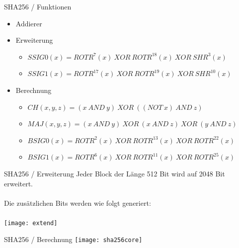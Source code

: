 \documentclass{beamer}
\begin{document}
    \begin{frame}{SHA256 / Funktionen}
      \begin{itemize}
      \setlength{\itemsep}{20pt}
      \item Addierer
      \item Erweiterung
        \begin{itemize}
          \setlength{\itemsep}{10pt}
          \item $ SSIG0(x) = ROTR^{7}(x)~XOR~ROTR^{18}(x)~XOR~SHR^{3}(x) $
          \item $ SSIG1(x) = ROTR^{17}(x)~XOR~ROTR^{19}(x)~XOR~SHR^{10}(x) $
        \end{itemize}
      \item Berechnung
        \begin{itemize}
          \setlength{\itemsep}{10pt}
          \item $ CH( x, y, z) = (x~AND~y)~XOR~( (NOT~x)~AND~z) $
          \item $ MAJ( x, y, z) = (x~AND~y)~XOR~(x~AND~z)~XOR~(y~AND~z) $
          \item $ BSIG0(x) = ROTR^{2}(x)~XOR~ROTR^{13}(x)~XOR~ROTR^{22}(x) $
          \item $ BSIG1(x) = ROTR^{6}(x)~XOR~ROTR^{11}(x)~XOR~ROTR^{25}(x) $
        \end{itemize}
      \end{itemize}
    \end{frame}
    \begin{frame}{SHA256 / Erweiterung}
      Jeder Block der Länge 512 Bit wird auf 2048 Bit erweitert.\\
      ~\\
      Die zusätzlichen Bits werden wie folgt generiert:\\
      ~\\
      \texttt{[image: extend]}
    \end{frame}
    \begin{frame}{SHA256 / Berechnung}
      \texttt{[image: sha256core]}
    \end{frame}
\end{document}
